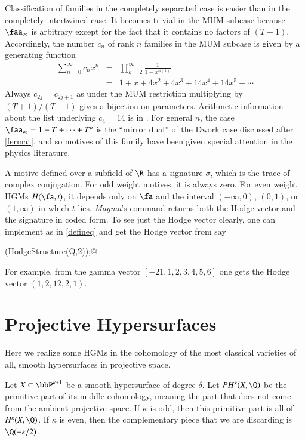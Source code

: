 \documentclass{notices}
\numberwithin{equation}{section}
\numberwithin{table}{section}
\numberwithin{figure}{section}
\begin{document}
{Classification of families in the completely separated case is 
easier than in the completely intertwined case.  It becomes
trivial in the MUM subcase because $\faa_\infty$ is arbitrary 
except for the fact that it contains no factors of $(T-1)$.  
Accordingly, the number $c_n$ of rank $n$ families
in the MUM subcase is given by a generating function
\begin{eqnarray}
\label{MUMcount}
\sum_{n=0}^\infty c_n x^n & = & \prod_{k=2}^\infty \frac{1}{1-x^{\phi(k)}}  \\
\nonumber &=& 1+x+4 x^2+4 x^3+14 x^4+14 x^5+ \cdots
\end{eqnarray}
Always $c_{2j}=c_{2j+1}$ as under the MUM restriction multiplying
by $(T+1)/(T-1)$ gives a bijection on parameters.  Arithmetic
information about the list underlying $c_4 = 14$ is in \cite{RV}.
For general $n$, the case $\faa_\infty=1+T+\cdots+T^n$ 
is the ``mirror dual'' of the Dwork case discussed after
\eqref{fermat}, and so motives of this family
have been given special attention in the physics literature.   

A motive defined over a subfield of $\R$ has a signature $\sigma$, which
is the trace of complex conjugation.  For odd weight motives, it
is always zero.  For even weight HGMs $H(\fa,t)$, it depends only on $\fa$ and
the interval $(-\infty,0)$, $(0,1)$, or $(1,\infty)$ in which $t$ lies.  
{\em Magma}'s command \verb@HodgeStructure@ returns 
both the Hodge vector and the signature in coded form.  
To see just the Hodge vector clearly, one can
implement \verb@Q@ as in \eqref{defineq} and 
get the Hodge vector from say
\smallskip

\verb@HodgeVector(HodgeStructure(Q,2));@
\smallskip

\noindent For example, from the gamma vector $[-21,1,2,3,4,5,6]$
one gets the Hodge vector $(1,2,12,2,1)$.


\section{Projective Hypersurfaces}
\label{proj-hypersurf} Here we realize some HGMs in 
the cohomology 
of the most classical varieties of all, 
smooth 
hypersurfaces in projective space.  

Let $X \subset \bbP^{\kappa+1}$ be a smooth hypersurface of 
degree $\delta$.  Let $PH^{\kappa}(X,\Q)$ be 
the primitive part of its middle cohomology, meaning the 
part that does not come from the ambient projective space.  If 
$\kappa$ is odd, then this primitive part is all of 
$H^{\kappa}(X,\Q)$. 
If $\kappa$ is even, then the complementary
piece that we are discarding is $\Q(-\kappa/2)$.

}
\end{document}
